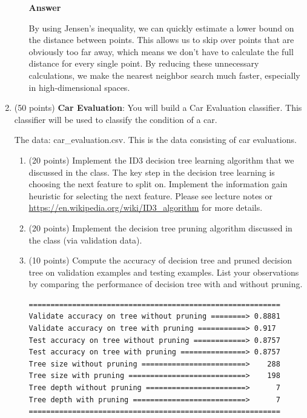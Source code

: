 \documentclass[11pt]{article}
\begin{document}
\begin{enumerate}
\begin{enumerate}
\textbf{Answer}

By using Jensen's inequality, we can quickly estimate a lower bound on the distance between points. This allows us to skip over points that are obviously too far away, which means we don't have to calculate the full distance for every single point. By reducing these unnecessary calculations, we make the nearest neighbor search much faster, especially in high-dimensional spaces.

\end{enumerate}

\item (50 points) \textbf{Car Evaluation}: You will
build a Car Evaluation classifier. This classifier will be
used to classify the condition of a car.

The data: car\_evaluation.csv. This is the data
consisting of car evaluations. 

\begin{enumerate}
\item (20 points) Implement the ID3 decision tree learning
algorithm that we discussed in the class. The key step in the
decision tree learning is choosing the next feature to split on.
Implement the information gain heuristic for selecting the next
feature. Please see lecture notes or
\url{https://en.wikipedia.org/wiki/ID3_algorithm} for more
details.

\item (20 points) Implement the decision tree pruning algorithm
discussed in the class (via validation data).

\item (10 points) Compute the accuracy of decision tree and
pruned decision tree on validation examples and testing examples.
List your observations by comparing the performance of decision
tree with and without pruning.

\begin{adjustwidth}{2cm}{2cm}
\begin{verbatim}
==========================================================
Validate accuracy on tree without pruning ========> 0.8881
Validate accuracy on tree with pruning ===========> 0.917
Test accuracy on tree without pruning ============> 0.8757
Test accuracy on tree with pruning ===============> 0.8757
Tree size without pruning ========================>    288
Tree size with pruning ===========================>    198
Tree depth without pruning =======================>      7
Tree depth with pruning ==========================>      7
==========================================================
\end{verbatim}
\end{adjustwidth}
\end{enumerate}


\end{enumerate}
\end{document}
